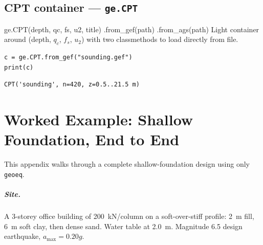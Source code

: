 \documentclass[11pt,a4paper,openany]{book}
\newcommand{\geo}{\texttt{geoeq}}
\begin{document}
\section{CPT container --- \texttt{ge.CPT}}

\begin{funcbox}{ge.CPT(depth, qc, fs, u2, title) \quad .from\_gef(path) \quad .from\_ags(path)}
Light container around (depth, $q_c$, $f_s$, $u_2$) with two
classmethods to load directly from file.
\end{funcbox}

\begin{lstlisting}
c = ge.CPT.from_gef("sounding.gef")
print(c)
\end{lstlisting}
\begin{lstlisting}[style=output]
CPT('sounding', n=420, z=0.5..21.5 m)
\end{lstlisting}

\appendix
\chapter{Worked Example: Shallow Foundation, End to End}\label{app:end_to_end}

This appendix walks through a complete shallow-foundation design
using only \geo{}.

\paragraph{Site.}
A 3-storey office building of 200~kN/column on a soft-over-stiff
profile: 2~m fill, 6~m soft clay, then dense sand. Water table
at 2.0~m. Magnitude 6.5 design earthquake, $a_{\max} = 0.20g$.
\end{document}
